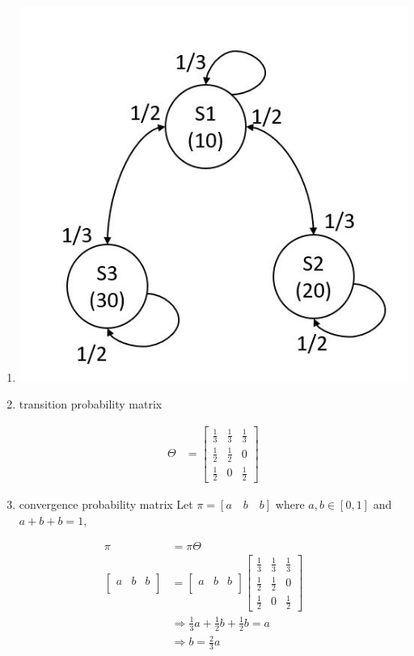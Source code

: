 \documentclass[11pt]{article}
\makeatletter
\def\maxwidth{\ifdim\Gin@nat@width>\linewidth\linewidth
    \else\Gin@nat@width\fi}
\let\Oldincludegraphics\includegraphics
\renewcommand{\includegraphics}[1]{\Oldincludegraphics[width=.8\maxwidth]{#1}}
\makeatother
\begin{document}
\begin{enumerate}
\def\labelenumi{\alph{enumi})}
\item
  \includegraphics{1a} 
  \medbreak
\item
  transition probability matrix

  \begin{align*}
  \Theta &= 
  \begin{bmatrix}
  \frac{1}{3} & \frac{1}{3} & \frac{1}{3} \\
  \frac{1}{2} & \frac{1}{2} & 0 \\
  \frac{1}{2} & 0 & \frac{1}{2}
  \end{bmatrix}
  \end{align*}
  \bigbreak
\item
  convergence probability matrix Let \(\pi = [ a \quad b \quad b ]\)
  where \(a,b \in [0,1]\) and \(a+b+b=1\), 
\end{enumerate}

\begin{align*}
\pi &= \pi \Theta\\
\begin{bmatrix}
a & b & b \\
\end{bmatrix}
&=
\begin{bmatrix}
a & b & b \\
\end{bmatrix}
\begin{bmatrix}
\frac{1}{3} & \frac{1}{3} & \frac{1}{3} \\
\frac{1}{2} & \frac{1}{2} & 0 \\
\frac{1}{2} & 0 & \frac{1}{2}
\end{bmatrix} \\
&\Rightarrow \frac{1}{3}a + \frac{1}{2}b + \frac{1}{2}b = a\\
&\Rightarrow b = \frac{2}{3}a \\
\end{align*}
\end{document}
